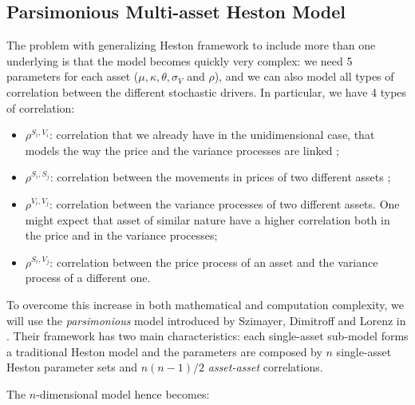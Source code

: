 \subsection{Parsimonious Multi-asset Heston Model}
The problem with generalizing Heston framework to include more than one underlying is that the model becomes quickly very complex: we need 5 parameters for each asset ($\mu, \kappa,\theta, \sigma_V$ and $ \rho$), and we can also model all types of correlation between the different stochastic drivers. In particular, we have 4 types of correlation: 
\begin{itemize}
	\item $ \rho^{S_i , V_i}$:  correlation that we already have in the unidimensional case, that models the way the price and the variance processes are linked ;
	\item $ \rho^{S_i , S_j}$: correlation between the movements in prices of two different assets ;
	\item $\rho^{V_i , V_j} $: correlation between the variance processes of two different assets. One might expect that asset of similar nature have a higher correlation both in the price and in the variance processes;
	\item $\rho^{S_i , V_j} $: correlation between the price process of an asset and the variance process of a different one.
\end{itemize}

To overcome this increase in both mathematical and computation complexity, we will use the \textit{parsimonious} model introduced by Szimayer, Dimitroff and Lorenz in \cite{PARSIMONIOUS2011}. Their framework has two main characteristics: each single-asset sub-model forms a traditional Heston model and the parameters are  composed by $n$ single-asset Heston parameter sets and $n (n-1)/2$  \textit{asset-asset} correlations.

The $n$-dimensional model  hence becomes:


